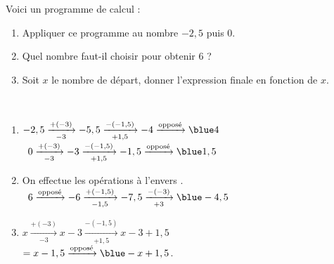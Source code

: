 \begin{exercice*}
   Voici un programme de calcul :
   \begin{center}
   \end{center}
   \begin{enumerate}
      \item Appliquer ce programme au nombre $-2,5$ puis 0.
      \item Quel nombre faut-il choisir pour obtenir 6 ?
      \item Soit $x$ le nombre de départ, donner l'expression finale en fonction de $x$.
   \end{enumerate}
\end{exercice*}

\begin{corrige}
   \ \\ [-5mm]
   \begin{enumerate}
      \item $-2,5 \xrightarrow[-3]{+(-3)} -5,5 \xrightarrow[+1,5]{-(-1,5)} -4 \xrightarrow{\text{opposé}} {\blue 4}$ \\ [1mm]
         \quad\, $0 \xrightarrow[-3]{+(-3)} -3 \xrightarrow[+1,5]{-(-1,5)} -1,5 \xrightarrow{\text{opposé}} {\blue 1,5}$ \\ [1mm]
      \item On effectue les opérations \og à l'envers \fg. \\ [1mm]
         \quad\, $6 \xrightarrow{\text{opposé}} -6 \xrightarrow[-1,5]{+(-1,5)} -7,5  \xrightarrow[+3]{-(-3)}{\blue -4,5}$ \\ [1mm]
      \item $x \xrightarrow[-3]{+(-3)} x-3 \xrightarrow[+1,5]{-(-1,5)} x-3+1,5$ \\
         \quad\; $=x-1,5 \xrightarrow{\text{opposé}}{\blue -x+1,5}$. \\ [1mm]
   \end{enumerate}
\end{corrige}
